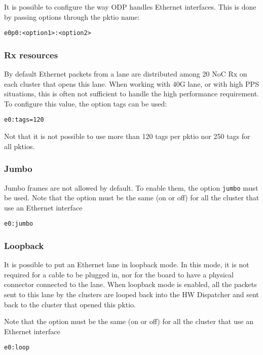 \documentclass{trkalray}
\begin{document}
It is possible to configure the way ODP handles Ethernet interfaces.
This is done by passing options through the pktio name:
\begin{lstlisting}
e0p0:<option1>:<option2>
\end{lstlisting}

\subsubsection{Rx resources}

By default Ethernet packets from a lane are distributed among 20 NoC Rx on each
cluster that opens this lane.
When working with 40G lane, or with high PPS situations, this is often
not sufficient to handle the high performance requirement.
To configure this value, the option tags can be used:
\begin{lstlisting}
e0:tags=120
\end{lstlisting}

Not that it is not possible to use more than 120 tags per pktio nor
250 tags for all pktios.

\subsubsection{Jumbo}

Jumbo frames are not allowed by default. To enable them, the option
\texttt{jumbo} must be used.
Note that the option must be the same (on or off) for all the cluster
that use an Ethernet interface

\begin{lstlisting}
e0:jumbo
\end{lstlisting}

\subsubsection{Loopback}

It is possible to put an Ethernet lane in loopback mode. In this mode,
it is not required for a cable to be plugged in, nor for the board to
have a physical connector connected to the lane.
When loopback mode is enabled, all the packets sent to this lane by
the clusters are looped back into the HW Dispatcher and sent back to
the cluster that opened this pktio.

Note that the option must be the same (on or off) for all the cluster
that use an Ethernet interface

\begin{lstlisting}
e0:loop
\end{lstlisting}
\end{document}
